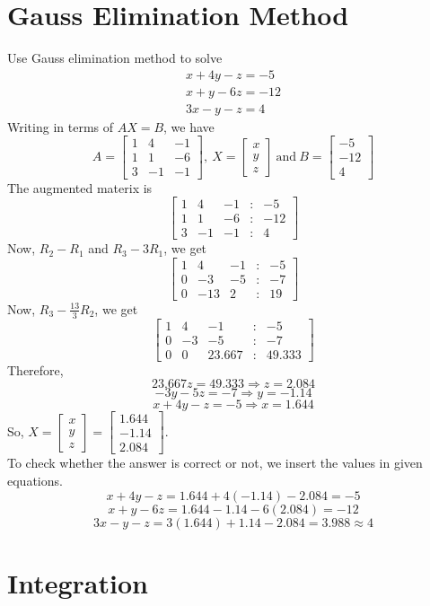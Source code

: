 \documentclass[]{book}
\begin{document}
\chapter{Gauss Elimination Method}
Use Gauss elimination method to solve
\begin{eqnarray}
\nonumber x+4y-z=-5\\
\nonumber x+y-6z=-12\\
\nonumber 3x-y-z=4
\end{eqnarray} 
Writing in terms of $AX = B$, we have
$$A = \begin{bmatrix}
1 & 4 & -1\\
1 & 1 & -6\\
3 & -1 & -1
\end{bmatrix},\ X = \begin{bmatrix}
x\\ y\\ z
\end{bmatrix}\ \text{and}\ B = \begin{bmatrix}
-5\\ -12\\ 4
\end{bmatrix}$$
The augmented materix is
$$\begin{bmatrix}
1 & 4 & -1 & : & -5\\
1 & 1 & -6 & : & -12\\
3 & -1 & -1 & : & 4
\end{bmatrix}$$
Now, $R_{2}-R_{1}$ and $R_{3}-3R_{1}$, we get
$$\begin{bmatrix}
1 & 4 & -1 & : & -5\\
0 & -3 & -5 & : & -7\\
0 & -13 & 2 & : & 19
\end{bmatrix}$$
Now, $R_{3} - \frac{13}{3}R_{2}$, we get
$$\begin{bmatrix}
1 & 4 & -1 & : & -5\\
0 & -3 & -5 & : & -7\\
0 & 0 & 23.667 & : & 49.333
\end{bmatrix}$$
Therefore,
$$23.667z = 49.333 \Rightarrow z = 2.084$$
$$-3y-5z=-7 \Rightarrow y = -1.14$$
$$x+4y-z=-5 \Rightarrow x = 1.644$$
So, $X = \begin{bmatrix}
x\\ y\\ z \end{bmatrix} = \begin{bmatrix}
1.644\\ -1.14\\ 2.084
\end{bmatrix}$.\\
To check whether the answer is correct or not, we insert the values in given equations.
$$x+4y-z= 1.644+4(-1.14)-2.084 = -5$$
$$x+y-6z= 1.644-1.14-6(2.084) = -12$$
$$3x-y-z= 3(1.644)+1.14-2.084 = 3.988 \approx 4$$


\chapter{Integration}







\end{document}
